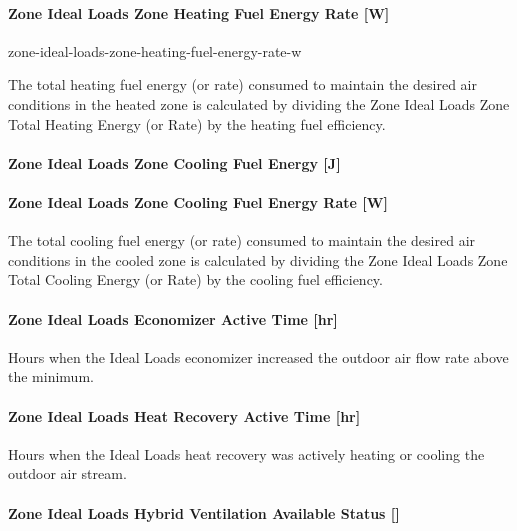 \paragraph{Zone Ideal Loads Zone Heating Fuel Energy Rate {[}W{]}}{zone-ideal-loads-zone-heating-fuel-energy-rate-w}

The total heating fuel energy (or rate) consumed to maintain the desired air conditions in the heated zone is calculated by dividing the Zone Ideal Loads Zone Total Heating Energy (or Rate) by the heating fuel efficiency.

\paragraph{Zone Ideal Loads Zone Cooling Fuel Energy {[}J{]}}\label{zone-ideal-loads-zone-cooling-fuel-energy-j}

\paragraph{Zone Ideal Loads Zone Cooling Fuel Energy Rate {[}W{]}}\label{zone-ideal-loads-zone-cooling-fuel-energy-rate-w}

The total cooling fuel energy (or rate) consumed to maintain the desired air conditions in the cooled zone is calculated by dividing the Zone Ideal Loads Zone Total Cooling Energy (or Rate) by the cooling fuel efficiency.

\paragraph{Zone Ideal Loads Economizer Active Time {[}hr{]}}\label{zone-ideal-loads-economizer-active-time-hr}

Hours when the Ideal Loads economizer increased the outdoor air flow rate above the minimum.

\paragraph{Zone Ideal Loads Heat Recovery Active Time {[}hr{]}}\label{zone-ideal-loads-heat-recovery-active-time-hr}

Hours when the Ideal Loads heat recovery was actively heating or cooling the outdoor air stream.

\paragraph{Zone Ideal Loads Hybrid Ventilation Available Status {[]}}\label{zone-ideal-loads-hybrid-ventilation-available-status}

